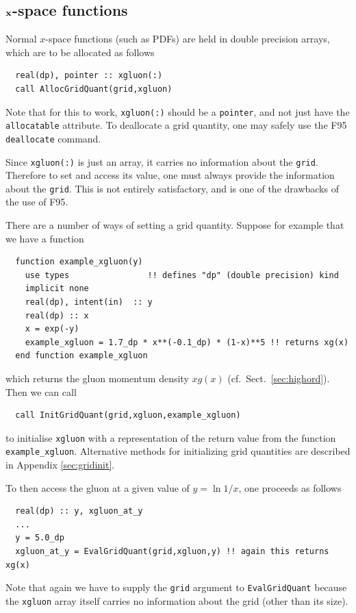 \documentclass[12pt]{article}
\newcommand{\cf}{cf.\ }
\newcommand{\hoppet}{\textsc{hoppet}\xspace}
\newcommand{\ttt}[1]{\texttt{#1}}
\begin{document}
\subsection{$\bf x$-space functions}
\label{sec:xspc}

Normal $x$-space functions (such as PDFs) are
held in double precision arrays, which are to be allocated as follows
\begin{lstlisting}
  real(dp), pointer :: xgluon(:)
  call AllocGridQuant(grid,xgluon)
\end{lstlisting}
Note that for this to work, \texttt{xgluon(:)} should be a
\texttt{pointer}, and not just 
have the \texttt{allocatable} attribute. To
deallocate a grid quantity, one may safely use the F95
\texttt{deallocate} command.

Since \texttt{xgluon(:)} is just an array, it carries no information
about the \texttt{grid}. Therefore to set and access its value, one
must always provide the information about the \texttt{grid}. This is
not entirely satisfactory, and is one of the drawbacks of the use of
F95.

There are a number of ways of setting a grid quantity. Suppose 
for example  that we have
a function
\begin{lstlisting}
  function example_xgluon(y)
    use types                !! defines "dp" (double precision) kind
    implicit none
    real(dp), intent(in)  :: y
    real(dp) :: x    
    x = exp(-y)
    example_xgluon = 1.7_dp * x**(-0.1_dp) * (1-x)**5 !! returns xg(x)  
  end function example_xgluon
\end{lstlisting}
which
returns the gluon
momentum density $xg(x)$ (\cf Sect.~\ref{sec:highord}).
%
Then we can call
\begin{lstlisting}
  call InitGridQuant(grid,xgluon,example_xgluon)
\end{lstlisting}
to initialise \texttt{xgluon} with a representation of the return value
from the function \texttt{example\_xgluon}.
Alternative methods for initializing grid quantities
are described in Appendix \ref{sec:gridinit}.

To then access the gluon at a given value of $y = \ln 1/x$, one
proceeds as follows
\begin{lstlisting}
  real(dp) :: y, xgluon_at_y
  ...
  y = 5.0_dp
  xgluon_at_y = EvalGridQuant(grid,xgluon,y) !! again this returns xg(x)
\end{lstlisting}
Note that again we have to supply 
the \texttt{grid} argument to \ttt{EvalGridQuant}
because the \ttt{xgluon} array itself carries no information about the
grid (other than its size).
\end{document}
